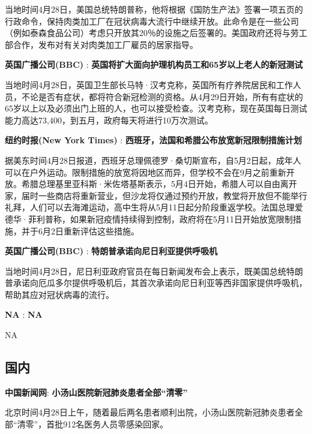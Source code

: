 \documentclass[
]{article}
\begin{document}
当地时间4月28日，美国总统特朗普称，他将根据《国防生产法》签署一项五页的行政命令，保持肉类加工厂在冠状病毒大流行中继续开放。此命令是在一些公司（例如泰森食品公司）考虑只开放其20％的设施之后签署的。美国政府还将与劳工部合作，发布对有关对肉类加工厂雇员的居家指导。

\textbf{\textcolor{glaucous}{英国广播公司(BBC)}} :
\textbf{英国将扩大面向护理机构员工和65岁以上老人的新冠测试}

当地时间4月28日，英国卫生部长马特·汉考克称，英国所有疗养院居民和工作人员，不论是否有症状，都将符合新冠检测的资格。从4月29日开始，所有有症状的65岁以上以及必须出门上班的人，也可以接受检查。汉考克称，现在英国每日测试能力高达73,400，到五月，政府每天将进行10万次测试。

\textbf{\textcolor{glaucous}{纽约时报(New York Times)}} :
\textbf{西班牙，法国和希腊公布放宽新冠限制措施计划 }

据美东时间4月28日报道，西班牙总理佩德罗·桑切斯宣布，自5月2日起，成年人可以在户外运动。限制措施的放宽将因地区而异，但学校不会在9月之前重新开放。希腊总理基里亚科斯·米佐塔基斯表示，5月4日开始，希腊人可以自由离开家，届时一些商店将重新营业，但沙龙将仅通过预约开放，教堂将开放但不能举行礼拜，人们可以去海滩运动，高中生将从5月11日起分阶段重返学校。法国总理爱德华·菲利普称，如果新冠疫情持续得到控制，政府将在5月11日开始放宽限制措施，并于6月2日重新评估这些措施。

\textbf{\textcolor{glaucous}{英国广播公司(BBC)}} :
\textbf{特朗普承诺向尼日利亚提供呼吸机 }

当地时间4月28日，尼日利亚政府官员在每日新闻发布会上表示，既美国总统特朗普承诺向厄瓜多尔提供呼吸机后，其首次承诺向尼日利亚等西非国家提供呼吸机，帮助其应对冠状病毒的流行。

\textbf{\textcolor{glaucous}{NA}} : \textbf{NA}

NA

\vspace{-5mm}

\hypertarget{section-1}{%
\subsection{\texorpdfstring{\textcolor{glaucous}{\Large 国内}}{}}\label{section-1}}

\vspace{-3mm}

\textbf{\textcolor{glaucous}{中国新闻网}}:
\textbf{小汤山医院新冠肺炎患者全部``清零'' }

北京时间4月28日上午，随着最后两名患者顺利出院，小汤山医院新冠肺炎患者全部``清零''，首批912名医务人员零感染回家。
\end{document}
